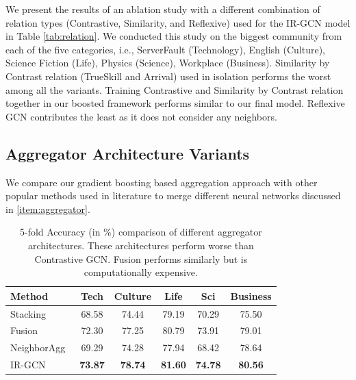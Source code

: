 We present the results of an ablation study with a different combination of relation types (Contrastive, Similarity, and Reflexive) used for the IR-GCN model in Table \ref{tab:relation}. We conducted this study on the biggest community from each of the five categories, i.e., ServerFault (Technology), English (Culture), Science Fiction (Life), Physics (Science), Workplace (Business).
Similarity by Contrast relation (TrueSkill and Arrival) used in isolation performs the worst among all the variants. Training Contrastive and Similarity by Contrast relation together in our boosted framework performs similar to our final model. Reflexive GCN contributes the least as it does not consider any neighbors.

\vspace{-0.1in}
\subsection{Aggregator Architecture Variants}
\label{sec:agg}
We compare our gradient boosting based aggregation approach with other popular methods used in literature to merge different neural networks discussed in \cref{item:aggregator}.

\begin{table}[h]
  \small
  \vspace{-0.15in}
  \begin{tabular}{l | c | c| c| c|c}
    \toprule
    \textbf{Method} &
     \textbf{Tech} &
     \textbf{Culture} &
     \textbf{Life} &
     \textbf{Sci}&
     \textbf{Business}\\
      \midrule
    Stacking~\cite{Stacking} &68.58 & 74.44 & 79.19 & 70.29 &75.50  \\
    Fusion~\cite{Fusion18}  &72.30 &77.25 & 80.79 & 73.91 &79.01 \\
    NeighborAgg~\cite{graphsage,relationalGCN}  &69.29 &74.28 & 77.94 & 68.42 &78.64   \\
    IR-GCN & \bfseries 73.87 & \bfseries 78.74 & \bfseries 81.60&  \bfseries74.78&  \bfseries80.56 \\
    \bottomrule
  \end{tabular}
  \caption{\small \label{tab:agg} 5-fold Accuracy (in \%) comparison of different aggregator architectures. These architectures perform worse than Contrastive GCN. Fusion performs similarly but is computationally expensive.}
  \vspace{-0.2in}
\end{table}

